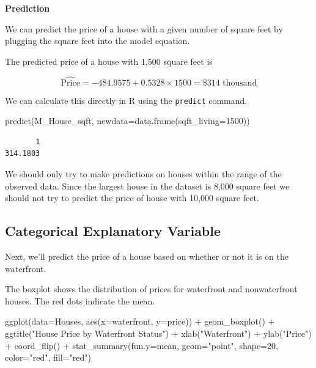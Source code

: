 \documentclass[
  letterpaper,
  DIV=11,
  numbers=noendperiod]{scrreprt}
\newenvironment{Shaded}{\begin{snugshade}}{\end{snugshade}}
\newcommand{\AttributeTok}[1]{\textcolor[rgb]{0.40,0.45,0.13}{#1}}
\newcommand{\DecValTok}[1]{\textcolor[rgb]{0.68,0.00,0.00}{#1}}
\newcommand{\FunctionTok}[1]{\textcolor[rgb]{0.28,0.35,0.67}{#1}}
\newcommand{\NormalTok}[1]{\textcolor[rgb]{0.00,0.23,0.31}{#1}}
\newcommand{\SpecialCharTok}[1]{\textcolor[rgb]{0.37,0.37,0.37}{#1}}
\newcommand{\StringTok}[1]{\textcolor[rgb]{0.13,0.47,0.30}{#1}}
\begin{document}
\textbf{Prediction}

We can predict the price of a house with a given number of square feet
by plugging the square feet into the model equation.

The predicted price of a house with 1,500 square feet is

\[
\widehat{\text{Price}} = -484.9575 + 0.5328\times 1500 = \$314{ \text{ thousand}}
\]

We can calculate this directly in R using the \texttt{predict} command.

\begin{Shaded}
\begin{Highlighting}[]
\FunctionTok{predict}\NormalTok{(M\_House\_sqft, }\AttributeTok{newdata=}\FunctionTok{data.frame}\NormalTok{(}\AttributeTok{sqft\_living=}\DecValTok{1500}\NormalTok{))}
\end{Highlighting}
\end{Shaded}

\begin{verbatim}
       1 
314.1803 
\end{verbatim}

We should only try to make predictions on houses within the range of the
observed data. Since the largest house in the dataset is 8,000 square
feet we should not try to predict the price of house with 10,000 square
feet.

\subsection{Categorical Explanatory
Variable}\label{categorical-explanatory-variable}

Next, we'll predict the price of a house based on whether or not it is
on the waterfront.

The boxplot shows the distribution of prices for waterfront and
nonwaterfront houses. The red dots indicate the mean.

\begin{Shaded}
\begin{Highlighting}[]
\FunctionTok{ggplot}\NormalTok{(}\AttributeTok{data=}\NormalTok{Houses, }\FunctionTok{aes}\NormalTok{(}\AttributeTok{x=}\NormalTok{waterfront, }\AttributeTok{y=}\NormalTok{price)) }\SpecialCharTok{+} \FunctionTok{geom\_boxplot}\NormalTok{() }\SpecialCharTok{+} 
  \FunctionTok{ggtitle}\NormalTok{(}\StringTok{"House Price by Waterfront Status"}\NormalTok{) }\SpecialCharTok{+} 
  \FunctionTok{xlab}\NormalTok{(}\StringTok{"Waterfront"}\NormalTok{) }\SpecialCharTok{+} \FunctionTok{ylab}\NormalTok{(}\StringTok{"Price"}\NormalTok{) }\SpecialCharTok{+} \FunctionTok{coord\_flip}\NormalTok{() }\SpecialCharTok{+} 
  \FunctionTok{stat\_summary}\NormalTok{(}\AttributeTok{fun.y=}\NormalTok{mean, }\AttributeTok{geom=}\StringTok{"point"}\NormalTok{, }\AttributeTok{shape=}\DecValTok{20}\NormalTok{, }\AttributeTok{color=}\StringTok{"red"}\NormalTok{, }\AttributeTok{fill=}\StringTok{"red"}\NormalTok{)}
\end{Highlighting}
\end{Shaded}
\end{document}

